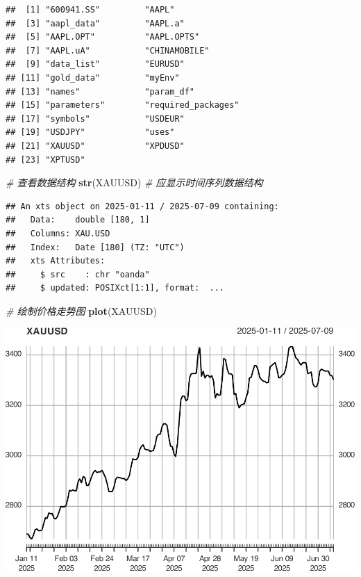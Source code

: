 \documentclass[]{ctexbook}
\newenvironment{Shaded}{\begin{snugshade}}{\end{snugshade}}
\newcommand{\CommentTok}[1]{\textcolor[rgb]{0.56,0.35,0.01}{\textit{#1}}}
\newcommand{\FunctionTok}[1]{\textcolor[rgb]{0.13,0.29,0.53}{\textbf{#1}}}
\newcommand{\NormalTok}[1]{#1}
\begin{document}
\begin{verbatim}
##  [1] "600941.SS"         "AAPL"             
##  [3] "aapl_data"         "AAPL.a"           
##  [5] "AAPL.OPT"          "AAPL.OPTS"        
##  [7] "AAPL.uA"           "CHINAMOBILE"      
##  [9] "data_list"         "EURUSD"           
## [11] "gold_data"         "myEnv"            
## [13] "names"             "param_df"         
## [15] "parameters"        "required_packages"
## [17] "symbols"           "USDEUR"           
## [19] "USDJPY"            "uses"             
## [21] "XAUUSD"            "XPDUSD"           
## [23] "XPTUSD"
\end{verbatim}

\begin{Shaded}
\begin{Highlighting}[]
\CommentTok{\# 查看数据结构}
\FunctionTok{str}\NormalTok{(XAUUSD)  }\CommentTok{\# 应显示时间序列数据结构}
\end{Highlighting}
\end{Shaded}

\begin{verbatim}
## An xts object on 2025-01-11 / 2025-07-09 containing: 
##   Data:    double [180, 1]
##   Columns: XAU.USD
##   Index:   Date [180] (TZ: "UTC")
##   xts Attributes:
##     $ src    : chr "oanda"
##     $ updated: POSIXct[1:1], format:  ...
\end{verbatim}

\begin{Shaded}
\begin{Highlighting}[]
\CommentTok{\# 绘制价格走势图}
\FunctionTok{plot}\NormalTok{(XAUUSD)}
\end{Highlighting}
\end{Shaded}

\includegraphics[width=0.9\linewidth]{quantmod_files/figure-latex/vis_xau-1}
\end{document}
